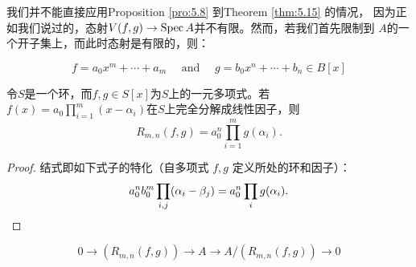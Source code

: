 我们并不能直接应用Proposition \ref{pro:5.8} 到Theorem \ref{thm:5.15} 的情况，
因为正如我们说过的，态射$V(f,g)\to \operatorname{Spec} A$并不有限。然而，若我们首先限制到
$A$的一个开子集上，而此时态射是有限的，则：

\begin{coro}\label{coro:5.16}
    \nottran
\end{coro}

\[
    f=a_0 x^m+\cdots+a_m \quad \text { and } \quad g=b_0 x^n+\cdots+b_n \in B[x]
\]

\begin{coro}\label{coro:5.17}
令$S$是一个环，而$f,g\in S[x]$为$S$上的一元多项式。若
$f(x)=a_0 \prod_{i=1}^m(x-\alpha_i)$在$S$上完全分解成线性因子，则
\[
    R_{m, n}(f, g)=a_0^n \prod_{i=1}^m g(\alpha_i).
\]
\end{coro}

\begin{proof}
结式即如下式子的特化（自多项式 $f,g$ 定义所处的环和因子）：
\[
    a_0^n b_0^m \prod_{i, j}(\alpha_i-\beta_j)=a_0^n \prod_i g(\alpha_i).
    \qedhere
\]
\end{proof}


\begin{exa}\label{exa:5.18}
    \nottran
\end{exa}

\begin{exe}\label{exe:5.19}
    \nottran
\[
    0 \to(R_{m, n}(f, g)) \to A \to A /(R_{m, n}(f, g)) \to 0
\]
\end{exe}

\begin{exe}\label{exe:5.20}
    \nottran
\end{exe}
